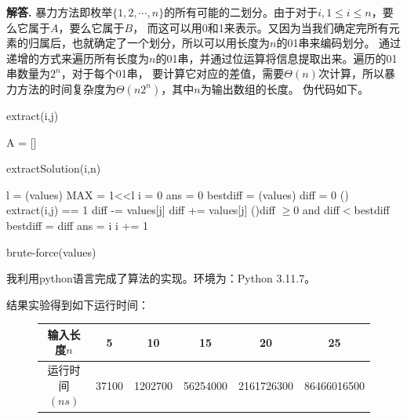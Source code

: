 \documentclass[12pt, a4paper, oneside]{article}
\newenvironment{solution}{\par\noindent\textbf{解答. }}{}
\begin{document}
\begin{solution}
    暴力方法即枚举$\{1,2,\cdots,n\}$的所有可能的二划分。由于对于$i,1\leq i\leq n$，要么它属于$A$，要么它属于$B$，
    而这可以用0和1来表示。又因为当我们确定完所有元素的归属后，也就确定了一个划分，所以可以用长度为$n$的01串来编码划分。
    通过递增的方式来遍历所有长度为$n$的01串，并通过位运算将信息提取出来。遍历的01串数量为$2^n$，对于每个01串，
    要计算它对应的差值，需要$\Theta(n)$次计算，所以暴力方法的时间复杂度为$\Theta(n2^n)$，其中$n$为输出数组的长度。
    伪代码如下。

    \begin{function}
        \caption{extract(i,j)}
    \end{function}
    \begin{function}
        A = []\;
        \caption{extractSolution(i,n)}
    \end{function}
    \begin{algorithm}[H]
        l = \len(values)\;
        MAX = 1<<l\;
        i = 0\;
        ans = 0\;
        bestdiff = \sum(values)\;
        {
            diff = 0\;
            {
                \eIf(){
                    extract(i,j) == 1\;
                }
                {
                    diff -= values[j]
                }
                {
                    diff += values[j]
                }
            }
            \If(){diff $\geq $0 and diff$<$bestdiff }
            {
                bestdiff = diff\;
                ans = i\;
            }
            i += 1\;
        }
        \caption{brute-force(values)}
    \end{algorithm}
我利用python语言完成了算法的实现。环境为：Python 3.11.7。

结果实验得到如下运行时间：

\begin{figure}[!h]
    \centering
 \begin{tabular}{c|c|c|c|c|c}
   输入长度$n$& 5  &  10& 15&20&25\\
   \hline 运行时间$(ns)$&   37100& 1202700& 56254000& 2161726300& 86466016500   \\
\end{tabular}   
\end{figure}


\end{solution}
\end{document}
